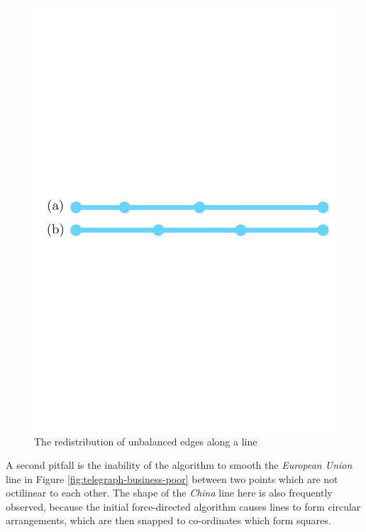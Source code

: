 \begin{figure}[htbp!]
	\centering
	\includegraphics[width=.5\textwidth]{img/results/equal-spacing.pdf}
	\caption{The redistribution of unbalanced edges along a line}
	\label{fig:equal-spacing}
\end{figure}

A second pitfall is the inability of the algorithm to smooth the \textit{European Union} line in Figure \ref{fig:telegraph-business-poor} between two points which are not octilinear to each other. The shape of the \textit{China} line here is also frequently observed, because the initial force-directed algorithm causes lines to form circular arrangements, which are then snapped to co-ordinates which form squares.

